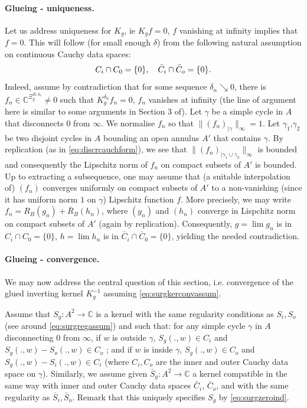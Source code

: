 \documentclass[10pt]{article}
\newcommand{\C}{\mathbb{C}}
\begin{document}
\paragraph{Glueing - uniqueness.} 
Let us address uniqueness for $K_g$, ie $K_gf=0$, $f$ vanishing at infinity implies that $f=0$. This will follow (for small enough $\delta$) from the following natural assumption on continuous Cauchy data spaces: 
\begin{equation}\label{eq:surgzeroind}
C_i\cap C_0=\{0\},{\rm\ \ \ }\bar C_i\cap \bar C_o=\{0\}.
\end{equation}
 Indeed, assume by contradiction that for some sequence $\delta_n\searrow 0$, there is $f_n\in\C^{\Xi^{B,\delta_n}_g}\neq 0$ such that $K_g^{\delta_n}f_n=0$, $f_n$ vanishes at infinity (the line of argument here is similar to some arguments in Section 3 of\cite{SmiChe_isoradial}). Let $\gamma$ be a simple cycle in $A$ that disconnects $0$ from $\infty$. We normalise $f_n$ so that $\|(f_n)_{|\gamma}\|_\infty=1$. Let $\gamma_1$,$\gamma_2$ be two disjoint cycles in $A$ bounding an open annulus $A'$ that contains $\gamma$. By replication (as in \eqref{eq:discrcauchform}), we see that $\|(f_n)_{|\gamma_1\cup\gamma_2}\|_\infty$ is bounded and consequently the Lipschitz norm of $f_n$ on compact subsets of $A'$ is bounded. Up to extracting a subsequence, one may assume that (a suitable interpolation of) $(f_n)$ converges uniformly on compact subsets of $A'$ to a non-vanishing (since it has uniform norm $1$ on $\gamma$) Lipschitz function $f$. More precisely, we may write $f_n=R_B(g_n)+\bar R_B(h_n)$, where $(g_n)$ and $(h_n)$ converge in Lispchitz norm on compact subsets of $A'$ (again by replication). Consequently, $g=\lim g_n  $ is in $C_i\cap C_0=\{0\}$,  $h=\lim h_n  $ is in $\bar C_i\cap \bar C_0=\{0\}$, yielding the needed contradiction.

\paragraph{Glueing - convergence.}

We may now address the central question of this section, i.e. convergence of the glued inverting kernel $K_g^{-1}$ assuming \eqref{eq:surgkerconvassum}.

Assume that $S_g:A^2\rightarrow\C$ is a kernel with the same regularity conditions as $S_i,S_o$ (see around \eqref{eq:surgregassum}) and such that: for any simple cycle $\gamma$ in $A$ disconnecting $0$ from $\infty$, if $w$ is outside $\gamma$, $S_g(.,w)\in C_i$ and $S_g(.,w)-S_o(.,w)\in C_o$ ; and if $w$ is inside $\gamma$, $S_g(.,w)\in C_o$ and $S_g(.,w)-S_i(.,w)\in C_i$ (where $C_i,C_o$ are the inner and outer Cauchy data space on $\gamma$). Similarly, we assume given $\bar S_g:A^2\rightarrow\C$ a kernel compatible in the same way with inner and outer Cauchy data spaces $\bar C_i$, $\bar C_o$, and with the same regularity as $\bar S_i,\bar S_o$. Remark that this uniquely specifies $S_g$ by \eqref{eq:surgzeroind}.
\end{document}
